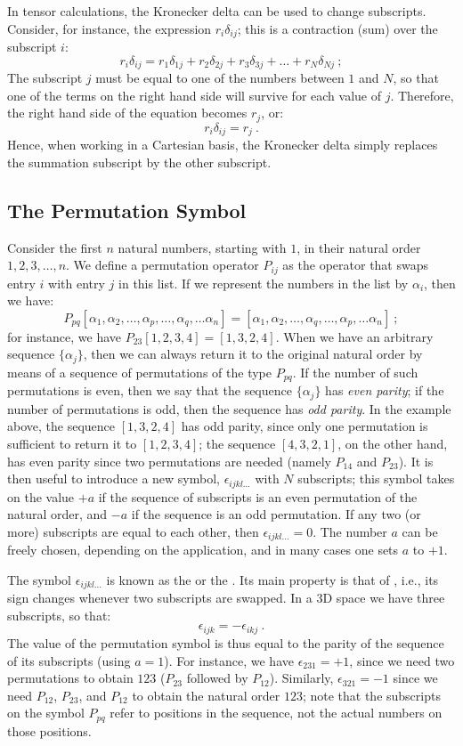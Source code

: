 In tensor calculations, the Kronecker delta can be used to change subscripts. Consider, for instance, the expression $r_i\delta_{ij}$; this is a contraction (sum) over the subscript $i$:
\[
	r_i\delta_{ij} = r_1\delta_{1j}+r_2\delta_{2j}+r_3\delta_{3j}+\ldots + r_N\delta_{Nj}\ ;
\]
The subscript $j$ must be equal to one of the numbers between $1$ and $N$, so that one of the terms on the right hand side will survive for each value of $j$. Therefore, the right hand side of the equation becomes $r_j$, or:
\[
	r_i\delta_{ij} = r_j\ .
\]
Hence, when working in a Cartesian basis, the Kronecker delta simply replaces the summation subscript by the other subscript.

\subsection{The Permutation Symbol}\label{\chabbr:ssec:permutationsymbol}
Consider the first $n$ natural numbers, starting with $1$, in their natural order $1, 2, 3, \ldots, n$.  We define a permutation operator $P_{ij}$ as the operator that swaps entry $i$ with entry $j$ in this list. If we represent the numbers in the list by $\alpha_{i}$, then we have:
\[
	P_{pq}[\alpha_1,\alpha_2,\ldots,\alpha_p,\ldots,\alpha_q,\ldots\alpha_n] = [\alpha_1,\alpha_2,\ldots,\alpha_q,\ldots,\alpha_p,\ldots\alpha_n]\ ; 
\]
for instance, we have $P_{23}[1,2,3,4] = [1,3,2,4]$. When we have an arbitrary sequence $\{\alpha_j\}$, then we can always return it to the original natural order by means of a sequence of permutations of the type $P_{pq}$. If the number of such permutations is even, then we say that the sequence $\{\alpha_j\}$ has \textit{even parity}; if the number of permutations is odd, then the sequence has \textit{odd parity}. In the example above, the sequence $[1,3,2,4]$ has odd parity, since only one permutation is sufficient to return it to $[1,2,3,4]$; the sequence $[4,3,2,1]$, on the other hand, has even parity since two permutations are needed (namely $P_{14}$ and $P_{23}$). It is then useful to introduce a new symbol, $\epsilon_{ijkl\ldots}$ with $N$ subscripts; this symbol takes on the value $+a$ if the sequence of subscripts is an even permutation of the natural order, and $-a$ if the sequence is an odd permutation.  If any two (or more) subscripts are equal to each other, then $\epsilon_{ijkl\ldots}=0$.  The number $a$ can be freely chosen, depending on the application, and in many cases one sets $a$ to $+1$.  

The symbol $\epsilon_{ijkl\ldots}$ is known as the  or the . Its main property is that of , i.e., its sign changes whenever two subscripts are swapped.  In a 3D space we have three subscripts, so that:
\[
	\epsilon_{ijk} = -\epsilon_{ikj}\ .
\]
The value of the permutation symbol is thus equal to the parity of the sequence of its subscripts (using $a=1$).  For instance, we have $\epsilon_{231}=+1$, since we need two permutations to obtain $123$ ($P_{23}$ followed by $P_{12}$). Similarly, $\epsilon_{321}=-1$ since we need $P_{12}$, $P_{23}$, and $P_{12}$ to obtain the natural order $123$; note that the subscripts on the symbol $P_{pq}$ refer to positions in the sequence, not the actual numbers on those positions.

